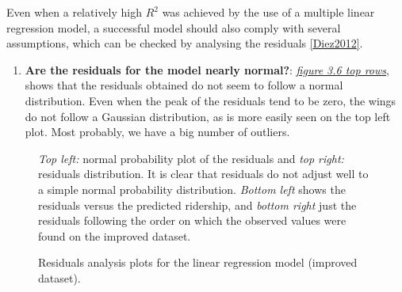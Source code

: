 \documentclass[a4paper,12pt,english]{sphinxmanual}
\begin{document}
Even when a relatively high \(R^2\) was achieved by the use of a multiple
linear regression model, a successful model should also comply with several
assumptions, which can be checked by analysing the residuals {\hyperref[overview:diez2012]{{[}Diez2012{]}}}.
\begin{enumerate}
\item {} 
\textbf{Are the residuals for the model nearly normal?}:
{\hyperref[section2:figure36]{\emph{figure 3.6 top rows}}}, shows that the residuals obtained do
not seem to follow a normal distribution. Even when the peak of the residuals
tend to be zero, the wings do not follow a Gaussian distribution, as is more
easily seen on the top left plot. Most probably, we have a big number of
outliers.

\end{enumerate}
\begin{figure}[htbp]
\centering
\capstart

\caption{Residuals analysis plots for the linear regression model (improved dataset).}{\small 
\emph{Top left:} normal probability plot of the residuals and \emph{top right:} residuals
distribution. It is clear that residuals do not adjust well to a simple normal
probability distribution. \emph{Bottom left} shows the residuals versus the
predicted ridership, and \emph{bottom right} just the residuals following the order
on which the observed values were found on the improved dataset.
}\label{section2:figure36}\end{figure}
\end{document}
